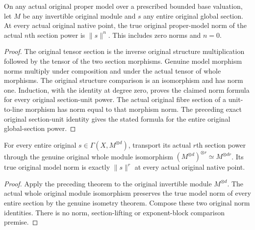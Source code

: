 \begin{theorem}
\label{thm:scheme-global-section-tensor-power-norm}
\leanok
{}
On any actual original proper model over a prescribed bounded base valuation,
let $M$ be any invertible original module and $s$ any entire original global
section. At every actual original native point, the true original proper-model
norm of the actual $n$th section power is $\lVert s\rVert^n$. This includes
zero norms and $n=0$.
\end{theorem}
\begin{proof}
The original tensor section is the inverse original structure multiplication
followed by the tensor of the two section morphisms. Genuine model morphism
norms multiply under composition and under the actual tensor of whole
morphisms. The original structure comparison is an isomorphism and has norm
one. Induction, with the identity at degree zero, proves the claimed norm
formula for every original section-unit power. The actual original fibre
section of a unit-to-line morphism has norm equal to that morphism norm.
The preceding exact original section-unit identity gives the stated formula
for the entire original global-section power.
\end{proof}

\begin{theorem}
\label{thm:scheme-global-section-block-power-norm}
\leanok
{}
For every entire original $s\in\Gamma(X,M^{\otimes d})$, transport its actual
$r$th section power through the genuine original whole module isomorphism
$(M^{\otimes d})^{\otimes r}\simeq M^{\otimes dr}$. Its true original model
norm is exactly $\lVert s\rVert^r$ at every actual original native point.
\end{theorem}
\begin{proof}
Apply the preceding theorem to the original invertible module
$M^{\otimes d}$. The actual whole original module isomorphism preserves the
true model norm of every entire section by the genuine isometry theorem.
Compose these two original norm identities. There is no norm, section-lifting
or exponent-block comparison premise.
\end{proof}
